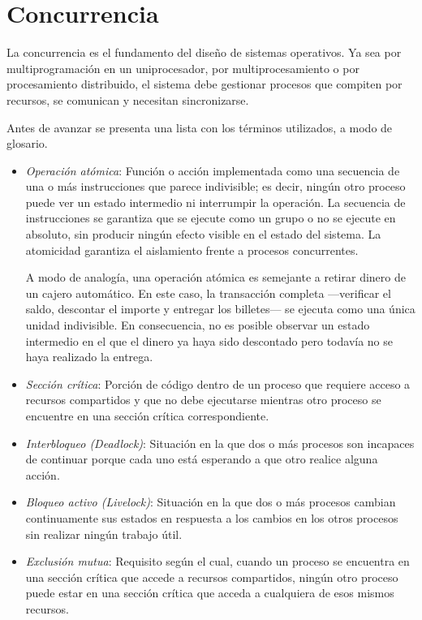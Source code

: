 \chapter{Concurrencia} \label{chpt:concurrencia}

La concurrencia es el fundamento del diseño de sistemas operativos. Ya sea por multiprogramación en un uniprocesador, por multiprocesamiento o por procesamiento distribuido, el sistema debe gestionar procesos que compiten por recursos, se comunican y necesitan sincronizarse.

Antes de avanzar se presenta una lista con los términos utilizados, a modo de glosario.

\begin{itemize}
\item \textit{Operación atómica}: Función o acción implementada como una secuencia de una o más instrucciones que parece indivisible; es decir, ningún otro proceso puede ver un estado intermedio ni interrumpir la operación. La secuencia de instrucciones se garantiza que se ejecute como un grupo o no se ejecute en absoluto, sin producir ningún efecto visible en el estado del sistema. La atomicidad garantiza el aislamiento frente a procesos concurrentes.

A modo de analogía, una operación atómica es semejante a retirar dinero de un cajero automático. En este caso, la transacción completa ---verificar el saldo, descontar el importe y entregar los billetes--- se ejecuta como una única unidad indivisible. En consecuencia, no es posible observar un estado intermedio en el que el dinero ya haya sido descontado pero todavía no se haya realizado la entrega.

\item \textit{Sección crítica}: Porción de código dentro de un proceso que requiere acceso a recursos compartidos y que no debe ejecutarse mientras otro proceso se encuentre en una sección crítica correspondiente.

\item \textit{Interbloqueo (Deadlock)}: Situación en la que dos o más procesos son incapaces de continuar porque cada uno está esperando a que otro realice alguna acción.

\item \textit{Bloqueo activo (Livelock)}: Situación en la que dos o más procesos cambian continuamente sus estados en respuesta a los cambios en los otros procesos sin realizar ningún trabajo útil.

\item \textit{Exclusión mutua}: Requisito según el cual, cuando un proceso se encuentra en una sección crítica que accede a recursos compartidos, ningún otro proceso puede estar en una sección crítica que acceda a cualquiera de esos mismos recursos.


\end{itemize}
